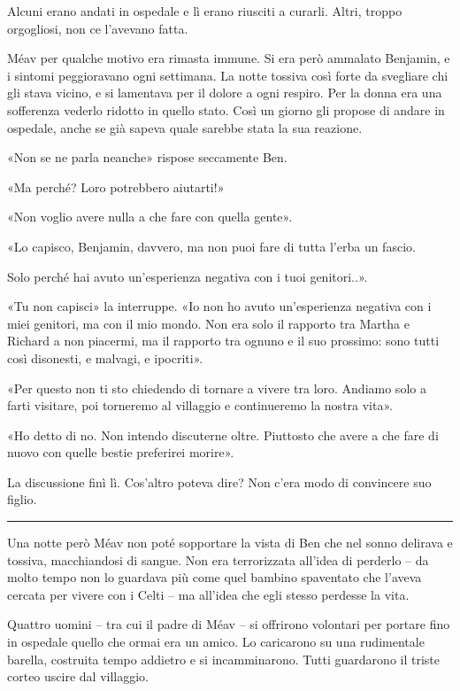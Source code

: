 \documentclass[a4paper,10pt]{memoir}
\begin{document}
Alcuni erano andati in ospedale e lì erano riusciti a curarli. Altri, troppo orgogliosi, non ce l'avevano fatta.

Méav per qualche motivo era rimasta immune. Si era però ammalato Benjamin, e i sintomi peggioravano ogni settimana. La
notte tossiva così forte da svegliare chi gli stava vicino, e si lamentava per il dolore a ogni respiro. Per la donna
era una sofferenza vederlo ridotto in quello stato. Così un giorno gli propose di andare in ospedale, anche se già
sapeva quale sarebbe stata la sua reazione.

«Non se ne parla neanche» rispose seccamente Ben.

«Ma perché? Loro potrebbero aiutarti!»

«Non voglio avere nulla a che fare con quella gente».

«Lo capisco, Benjamin, davvero, ma non puoi fare di tutta l'erba un fascio.

Solo perché hai avuto un'esperienza negativa con i tuoi genitori..».

«Tu non capisci» la interruppe. «Io non ho avuto un'esperienza negativa con i miei genitori, ma con il mio mondo. Non
era solo il rapporto tra Martha e Richard a non piacermi, ma il rapporto tra ognuno e il suo prossimo: sono tutti così
disonesti, e malvagi, e ipocriti».

«Per questo non ti sto chiedendo di tornare a vivere tra loro. Andiamo solo a farti visitare, poi torneremo al villaggio
e continueremo la nostra vita».

«Ho detto di no. Non intendo discuterne oltre. Piuttosto che avere a che fare di nuovo con quelle bestie preferirei
morire».

La discussione finì lì. Cos'altro poteva dire? Non c'era modo di convincere suo figlio.

\plainbreak{1}

Una notte però Méav non poté sopportare la vista di Ben che nel sonno delirava e tossiva, macchiandosi di sangue. Non
era terrorizzata all'idea di perderlo -- da molto tempo non lo guardava più come quel bambino spaventato che l'aveva
cercata per vivere con i Celti -- ma all'idea che egli stesso perdesse la vita.

Quattro uomini -- tra cui il padre di Méav -- si offrirono volontari per portare fino in ospedale quello che ormai era
un amico. Lo caricarono su una rudimentale barella, costruita tempo addietro e si incamminarono. Tutti guardarono il
triste corteo uscire dal villaggio.
\end{document}
